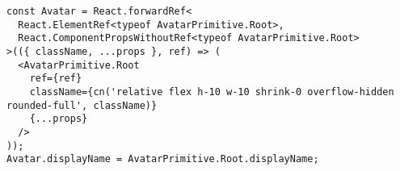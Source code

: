\documentclass[11pt,a4paper]{report}
\begin{document}

\newpage




\printbibliography

\begin{verbatim}
const Avatar = React.forwardRef<
  React.ElementRef<typeof AvatarPrimitive.Root>,
  React.ComponentPropsWithoutRef<typeof AvatarPrimitive.Root>
>(({ className, ...props }, ref) => (
  <AvatarPrimitive.Root
    ref={ref}
    className={cn('relative flex h-10 w-10 shrink-0 overflow-hidden rounded-full', className)}
    {...props}
  />
));
Avatar.displayName = AvatarPrimitive.Root.displayName;

\end{verbatim}
\end{document}
